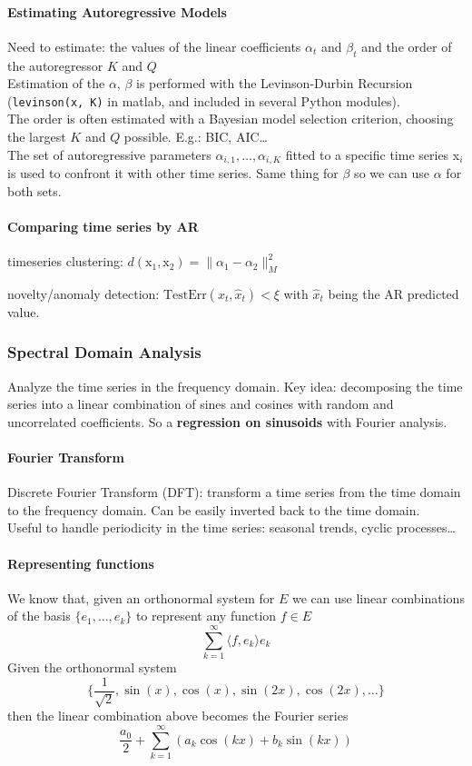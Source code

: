 \documentclass[10pt]{report}
\begin{document}
\paragraph{Estimating Autoregressive Models} Need to estimate: the values of the linear coefficients $\alpha_t$ and $\beta_t$ and the order of the autoregressor $K$ and $Q$\\
Estimation of the $\alpha$, $\beta$ is performed with the Levinson-Durbin Recursion (\texttt{levinson(x, K)} in matlab, and included in several Python modules).\\
The order is often estimated with a Bayesian model selection criterion, choosing the largest $K$ and $Q$ possible. E.g.: BIC, AIC\ldots\\
The set of autoregressive parameters $\alpha_{i,1},\ldots,\alpha_{i,K}$ fitted to a specific time series x$_i$ is used to confront it with other time series. Same thing for $\beta$ so we can use $\alpha$ for both sets.
\paragraph{Comparing time series by AR}\begin{list}{}{}
	\item timeseries clustering: $d(\text{x}_1,\text{x}_2)=\|\alpha_1-\alpha_2\|_M^2$
	\item novelty/anomaly detection: $\text{TestErr}(x_t,\hat{x}_t)<\xi$ with $\hat{x}_t$ being the AR predicted value.
\end{list}
\subsubsection{Spectral Domain Analysis}
Analyze the time series in the frequency domain. Key idea: decomposing the time series into a linear combination of sines and cosines with random and uncorrelated coefficients. So a \textbf{regression on sinusoids} with Fourier analysis.
\paragraph{Fourier Transform} Discrete Fourier Transform (DFT): transform a time series from the time domain to the frequency domain. Can be easily inverted back to the time domain.\\
Useful to handle periodicity in the time series: seasonal trends, cyclic processes\ldots
\paragraph{Representing functions} We know that, given an orthonormal system for $E$ we can use linear combinations of the basis $\{e_1,\ldots,e_k\}$ to represent any function $f\in E$ $$\sum_{k=1}^\infty \langle f,e_k\rangle e_k$$
Given the orthonormal system $$\{\frac{1}{\sqrt{2}}, \sin(x),\cos(x),\sin(2x),\cos(2x),\ldots\}$$
then the linear combination above becomes the Fourier series 
$$\frac{a_0}{2}+\sum_{k=1}^\infty\left(a_k\cos(kx)+b_k\sin(kx)\right)$$
\end{document}
